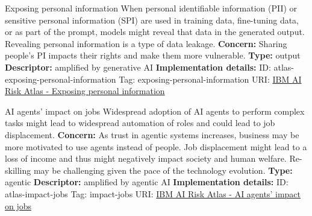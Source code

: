 \documentclass[a4paper,12pt]{article}
\begin{document}
\begin{definitionbox}{Exposing personal information}
When personal identifiable information (PII) or sensitive personal information (SPI) are used in training data, fine-tuning data, or as part of the prompt, models might reveal that data in the generated output. Revealing personal information is a type of data leakage.\newline\newline
\textbf{Concern: }Sharing people's PI impacts their rights and make them more vulnerable.\newline\newline
\textbf{Type: }output\newline
\textbf{Descriptor: }amplified by generative AI \newline\newline
\textbf{Implementation details: } \newline
ID: atlas-exposing-personal-information \newline
Tag: exposing-personal-information \newline
URI:  \href{https://www.ibm.com/docs/en/watsonx/saas?topic=SSYOK8/wsj/ai-risk-atlas/exposing-personal-information.html}{IBM AI Risk Atlas - Exposing personal information}\newline
\end{definitionbox}
\begin{definitionbox}{AI agents' impact on jobs}
Widespread adoption of AI agents to perform complex tasks might lead to widespread automation of roles and could lead to job displacement.\newline\newline
\textbf{Concern: }As trust in agentic systems increases, business may be more motivated to use agents instead of people. Job displacement might lead to a loss of income and thus might negatively impact society and human welfare. Re-skilling may be challenging given the pace of the technology evolution.\newline\newline
\textbf{Type: }agentic\newline
\textbf{Descriptor: }amplified by agentic AI \newline\newline
\textbf{Implementation details: } \newline
ID: atlas-impact-jobs \newline
Tag: impact-jobs \newline
URI:  \href{https://www.ibm.com/docs/en/watsonx/saas?topic=SSYOK8/wsj/ai-risk-atlas/impact-jobs.html}{IBM AI Risk Atlas - AI agents' impact on jobs}\newline
\end{definitionbox}
\end{document}
